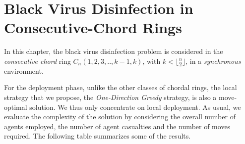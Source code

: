 


\chapter {Black Virus Disinfection in Consecutive-Chord Rings}
\label{CL}
 


In this chapter, the black virus disinfection problem is considered in the {\it consecutive chord}  ring $C_n(1,2,3,..,k-1,k)$, with  $k < \lfloor\frac{n}{2}\rfloor$,  in a {\it synchronous} environment. 





For the deployment phase, unlike the other classes of chordal rings, the local strategy that we propose, the {\it One-Direction Greedy} strategy,  is also a move-optimal solution. We thus only concentrate on local deployment.
As usual, we evaluate the complexity of the solution
 by considering the  overall number of agents employed, the number of agent casualties and the number of moves required.   The following table summarizes some of the results. 

 

\begin{center}
 \end{center}






